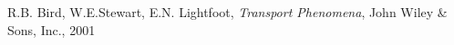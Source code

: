 \documentclass[10pt,twocolumn]{article}
\begin{document}







\vspace{5mm}



















\thebibliography{}

 R.B. Bird, W.E.Stewart, E.N. Lightfoot, \textit{Transport Phenomena}, John Wiley \& Sons, Inc., 2001
\end{document}
